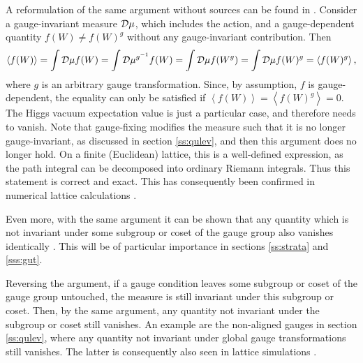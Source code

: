 \documentclass[final,12pt,3p,longtitle]{elsarticle}
\newcommand*{\no}{\noindent}
\newcommand*{\be}{\begin{equation}}
\newcommand*{\ee}{\end{equation}}
\newcommand*{\nn}{\nonumber}
\newcommand*{\1}{1\!\!\!\bot}
\newcommand*{\la}{\left\langle}
\newcommand*{\ra}{\right\rangle}
\begin{document}
A reformulation of the same argument without sources can be found in \cite{Frohlich:1980gj}. Consider a gauge-invariant measure ${\cal D}\mu$, which includes the action, and a gauge-dependent quantity $f(W)\neq f(W)^g$ without any gauge-invariant contribution. Then \cite{Frohlich:1980gj}
\be
\la f(W)\ra=\int{\cal D}\mu f(W)=\int{\cal D}\mu^{g^{-1}}f(W)=\int{\cal D}\mu f(W^{g})=\int{\cal D}\mu f(W)^g=\la f(W)^g\ra\nn,
\ee
\no where $g$ is an arbitrary gauge transformation. Since, by assumption, $f$ is gauge-dependent, the equality can only be satisfied if $\la f(W)\ra=\la f(W)^g\ra=0$. The Higgs vacuum expectation value is just a particular case, and therefore needs to vanish. Note that gauge-fixing modifies the measure such that it is no longer gauge-invariant, as discussed in section \ref{ss:qulev}, and then this argument does no longer hold.
On a finite (Euclidean) lattice, this is a well-defined expression, as the path integral can be decomposed into ordinary Riemann integrals. Thus this statement is correct and exact. This has consequently been confirmed in numerical lattice calculations \cite{Caudy:2007sf,Maas:2012ct}.

Even more, with the same argument it can be shown that any quantity which is not invariant under some subgroup or coset of the gauge group also vanishes identically \cite{Frohlich:1980gj}. This will be of particular importance in sections \ref{ss:strata} and \ref{sss:gut}.

Reversing the argument, if a gauge condition leaves some subgroup or coset of the gauge group untouched, the measure is still invariant under this subgroup or coset. Then, by the same argument, any quantity not invariant under the subgroup or coset still vanishes. An example are the non-aligned gauges in section \ref{ss:qulev}, where any quantity not invariant under global gauge transformations still vanishes. The latter is consequently also seen in lattice simulations \cite{Maas:2012ct}.
\end{document}
